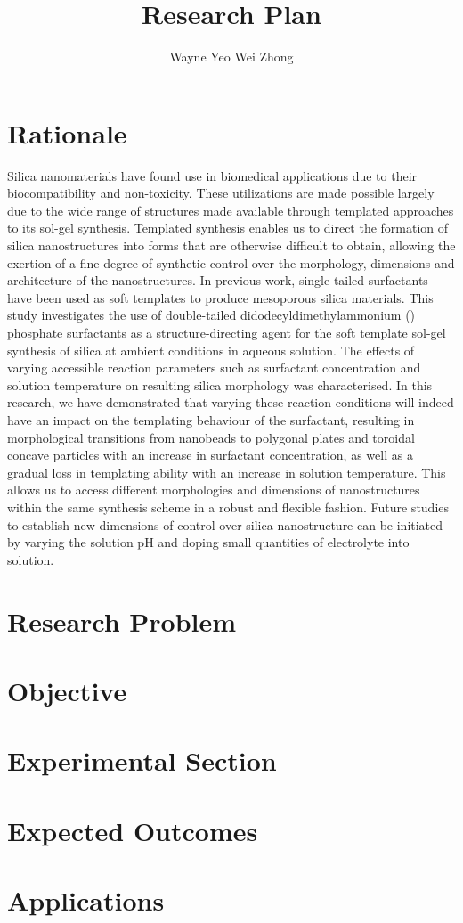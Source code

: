 \documentclass[a4paper,12pt]{article}
\date{}
\author{Wayne Yeo Wei Zhong} %
\title{Research Plan} %
\begin{document}
	\maketitle
	
	\section*{Rationale}
	Silica nanomaterials have found use in biomedical applications due to their biocompatibility and non-toxicity. These utilizations are made possible largely due to the wide range of structures made available through templated approaches to its sol-gel synthesis. Templated synthesis enables us to direct the formation of silica nanostructures into forms that are otherwise difficult to obtain, allowing the exertion of a fine degree of synthetic control over the morphology, dimensions and architecture of the nanostructures. In previous work, single-tailed surfactants have been used as soft templates to produce mesoporous silica materials. This study investigates the use of double-tailed didodecyldimethylammonium () phosphate surfactants as a structure-directing agent for the soft template sol-gel synthesis of silica at ambient conditions in aqueous solution. The effects of varying accessible reaction parameters such as surfactant concentration and solution temperature on resulting silica morphology was characterised. In this research, we have demonstrated that varying these reaction conditions will indeed have an impact on the templating behaviour of the surfactant, resulting in morphological transitions from nanobeads to polygonal plates and toroidal concave particles with an increase in surfactant concentration, as well as a gradual loss in templating ability with an increase in solution temperature. This allows us to access different morphologies and dimensions of nanostructures within the same synthesis scheme in a robust and flexible fashion. Future studies to establish new dimensions of control over silica nanostructure can be initiated by varying the solution pH and doping small quantities of electrolyte into solution.
	
	\section*{Research Problem}	 
	
	\section*{Objective}
	
	\section*{Experimental Section}
	
	\section*{Expected Outcomes}
	
	\section*{Applications}
	 
	
\end{document}
